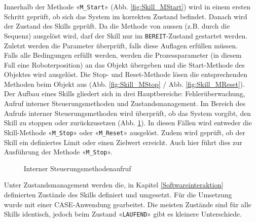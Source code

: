 		Innerhalb der Methode «\verb|M_Start|» (Abb. \ref{fig:Skill_MStart}) wird in einem ersten Schritt geprüft, ob sich das System im korrekten Zustand befindet. Danach wird der Zustand des Skills geprüft. Da die Methode von aussen (z.B. durch die Sequenz) ausgelöst wird, darf der Skill nur im \verb|BEREIT|-Zustand gestartet werden. Zuletzt werden die Parameter überprüft, falls diese Auflagen erfüllen müssen. Falls alle Bedingungen erfüllt werden, werden die Prozessparameter (in diesem Fall eine Roboterposition) an das Objekt übergeben und die Start-Methode des Objektes wird ausgelöst. Die Stop- und Reset-Methode lösen die entsprechenden Methoden beim Objekt aus (Abb. \ref{fig:Skill_MStop} / Abb. \ref{fig:Skill_MReset}).
		\\
		Der Aufbau eines Skills gliedert sich in drei Hauptbereiche: Fehlerüberwachung, Aufruf interner Steuerungsmethoden und Zustandsmanagement. Im Bereich des Aufrufs interner Steuerungsmethoden wird überprüft, ob das System vorgibt, den Skill zu stoppen oder zurückzusetzen (Abb. \ref{fig:Methodenaufruf}). In diesen Fällen wird entweder die Skill-Methode «\verb|M_Stop|» oder «\verb|M_Reset|» ausgelöst. Zudem wird geprüft, ob der Skill ein definiertes Limit oder einen Zielwert erreicht. Auch hier führt dies zur Ausführung der Methode «\verb|M_Stop|».
		
		\begin{figure}[h!]
			\centering
			\captionsetup{justification=centering}
			\caption{Interner Steuerungsmethodenaufruf}
			\label{fig:Methodenaufruf}
		\end{figure}
		
		\newpage
		
		Unter Zustandsmanagement werden die, in Kapitel \ref{Softwareinteraktion} definierten Zustände des Skills definiert und umgesetzt. Für die Umsetzung wurde mit einer CASE-Anwendung gearbeitet.  Die meisten Zustände sind für alle Skills identisch, jedoch beim Zustand «\verb|LAUFEND|» gibt es kleinere Unterschiede. 
		
